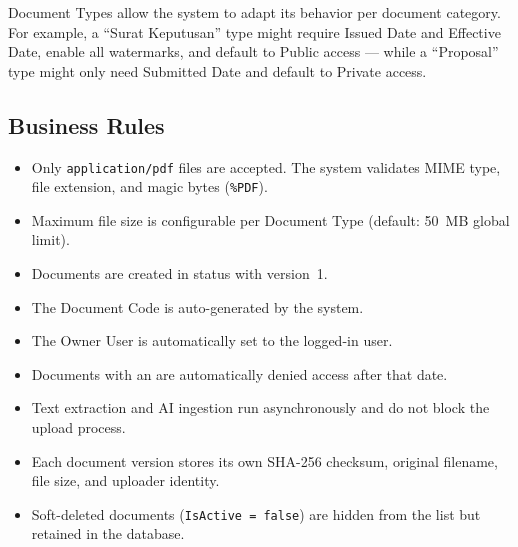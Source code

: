 \begin{ugTip}
  Document Types allow the system to adapt its behavior
  per document category. For example, a ``Surat Keputusan''
  type might require Issued Date and Effective Date, enable
  all watermarks, and default to Public access --- while a
  ``Proposal'' type might only need Submitted Date and
  default to Private access.
\end{ugTip}

\subsection{Business Rules}

\begin{itemize}[leftmargin=18pt]
  \item Only \texttt{application/pdf} files are accepted.
        The system validates MIME type, file extension, and
        magic bytes (\texttt{\%PDF}).
  \item Maximum file size is configurable per Document Type
        (default: 50~MB global limit).
  \item Documents are created in
         status with version~1.
  \item The Document Code is auto-generated by the system.
  \item The Owner User is automatically set to the
        logged-in user.
  \item Documents with an  are
        automatically denied access after that date.
  \item Text extraction and AI ingestion run asynchronously
        and do not block the upload process.
  \item Each document version stores its own SHA-256 checksum,
        original filename, file size, and uploader identity.
  \item Soft-deleted documents (\texttt{IsActive = false})
        are hidden from the list but retained in the database.
\end{itemize}

\newpage
